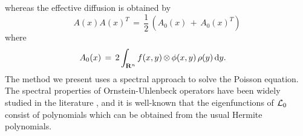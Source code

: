 whereas the effective diffusion is obtained by
\begin{equation}
    A(x)A(x)^T \,=\, \frac 12\, \left(A_0(x) \,+\, A_0(x)^T\right)
    \label{eq: chap2 diff}
\end{equation}
where
\begin{equation}
    \begin{aligned}
        A_0(x) &\,=\, 2 \int_{\mathbf R^n}  f(x,y)\, {\otimes}\, {\phi}(x,y)\, {\rho}(y) \, \mathrm dy.
    \end{aligned}
\end{equation}
The method we present uses a spectral approach to solve the Poisson equation.
The spectral properties of Ornstein-Uhlenbeck operators have been widely
studied in the literature \citep{lorenzi2006analytical,metafune2002spectrum},
and it is well-known that the eigenfunctions of $\mathcal L_0$ consist of
polynomials which can be obtained from the usual Hermite polynomials. 
